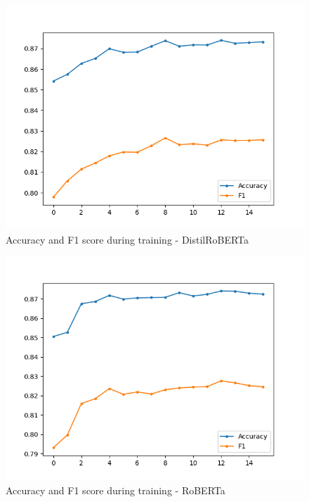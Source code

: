 \documentclass[10pt, a4paper]{article}
\begin{document}
\begin{figure}
\begin{center}
\includegraphics[width=\columnwidth]{figures/train-metrics-distilroberta.png}
\caption{Accuracy and F1 score during training - DistilRoBERTa}
\label{fig:train-metrics-distilroberta}
\end{center}
\end{figure}

\begin{figure}
\begin{center}
\includegraphics[width=\columnwidth]{figures/train-metrics-roberta.png}
\caption{Accuracy and F1 score during training - RoBERTa}
\label{fig:train-metrics-roberta}
\end{center}
\end{figure}
\end{document}
